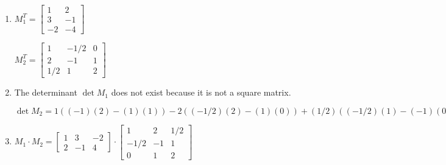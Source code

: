 \documentclass{article}
\begin{document}
\begin{enumerate}
{\begin{enumerate}[label=\roman*.]
{                $
                M_{2}^{-1} = 
                -4/5
                \begin{bmatrix}
                -3 & -7/2 & 5/2 \\
                1 & 2 & -5/4 \\
                -1/2 & -1 & 0
                \end{bmatrix}
                =
                \begin{bmatrix}
                12/5 & 14/5 & -2 \\
                -4/5 & -8/5 & 1 \\
                -2/5 & 4/5 & 0
                \end{bmatrix}
                $
            }
            
            \item {
                $
                M_{1}^{T} = 
                \begin{bmatrix}
                1 & 2 \\
                3 & -1 \\
                -2 & -4
                \end{bmatrix}
                $
            
                $
                M_{2}^{T} =
                \begin{bmatrix}
                1 & -1/2 & 0 \\
                2 & -1 & 1 \\
                1/2 & 1 & 2
                \end{bmatrix}
                $
            }
            
            \item {
                The determinant $\det M_{1}$ does not exist because it is not a square matrix.
                
                $
                \det M_{2} =
                1((-1)(2) - (1)(1)) -
                2((-1/2)(2) - (1)(0)) + 
                (1/2)((-1/2)(1) - (-1)(0))
                = -4/5
                $
            }
            
            \item {
                $
                M_{1} \cdot M_{2} =
                \begin{bmatrix}
                1 & 3 & -2 \\
                2 & -1 & 4
                \end{bmatrix}
                \cdot
                \begin{bmatrix}
                1 & 2 & 1/2 \\
                -1/2 & -1 & 1 \\
                0 & 1 & 2
                \end{bmatrix}
                $
                
}
\end{enumerate}}
\end{enumerate}
\end{document}
